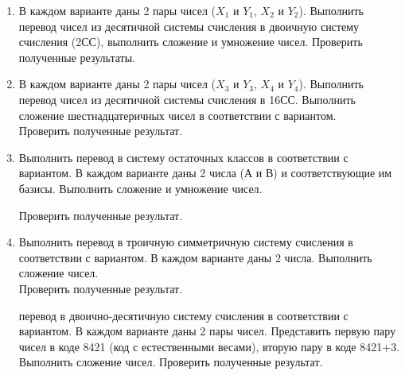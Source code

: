 \documentclass[oneside,a4paper,14pt]{extarticle} %
\begin{document}
 \begin{enumerate}
     \item В каждом варианте даны 2 пары чисел ($X_1$ и $Y_1$, $X_2$ и $Y_2$).  Выполнить перевод чисел из десятичной системы счисления в двоичную систему счисления (2СС), выполнить сложение и умножение чисел. Проверить полученные результаты.
\item  В каждом варианте даны 2 пары чисел ($X_3$ и $Y_3$, $X_4$ и $Y_4$). Выполнить перевод чисел из десятичной системы счисления в 16СС.  Выполнить сложение шестнадцатеричных чисел в соответствии с вариантом.\\ 
Проверить полученные результат.
\item 
Выполнить перевод в систему остаточных классов в соответствии с вариантом. В каждом варианте даны 2 числа (А и В) и соответствующие им базисы. Выполнить сложение и умножение чисел. 

Проверить полученные результат.

\item Выполнить перевод в троичную симметричную систему счисления в соответствии с вариантом. В каждом варианте даны 2 числа. Выполнить сложение чисел.\\
Проверить полученные результат.

 перевод в двоично-десятичную систему счисления в соответствии с вариантом. В каждом варианте даны 2 пары чисел. Представить первую пару чисел в коде 8421 (код с естественными весами), вторую пару в коде 8421+3.\\
Выполнить сложение чисел. Проверить полученные результат.


 \end{enumerate}
\end{document}
